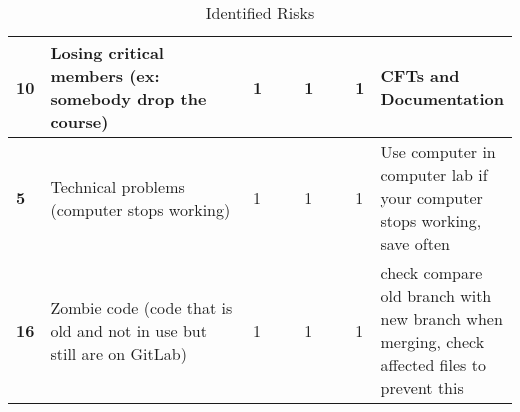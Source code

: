 \begin{table}[H]
\begin{adjustbox}{width=1\textwidth}
\begin{tabular}{|p{0.05\linewidth}|p{0.6\linewidth}|p{0.15\linewidth}|p{0.15\linewidth}|p{0.35\linewidth}|p{0.6\linewidth}|}
\textbf{10} & Losing critical members (ex: somebody drop the course) & 1 & 1 & 1 & CFTs and Documentation \\ \hline

\textbf{5} & Technical problems (computer stops working) & 1 & 1 & 1 & Use computer in computer lab if your computer stops working, save often \\ \hline

\textbf{16} & Zombie code (code that is old and not in use but still are on GitLab) & 1 & 1 & 1 & check compare old branch with new branch when merging, check affected files to prevent this \\ \hline

\end{tabular}
\end{adjustbox}
\caption{Identified Risks}
\label{tab: risk}
\end{table}


